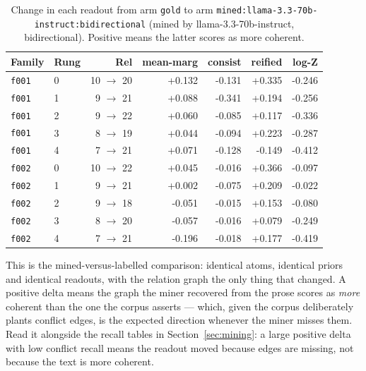 \documentclass[11pt]{article}
\begin{document}
\begin{table}[htbp]
\centering
\small
\caption{Change in each readout from arm \texttt{gold} to arm \texttt{mined:llama-3.3-70b-instruct:bidirectional} (mined by llama-3.3-70b-instruct, bidirectional). Positive means the latter scores as more coherent.}
\label{tab:arm-delta-gold-mined-llama-3-3-70b-instruct-bidirectional}
\begin{tabular}{llrrrrr}
\toprule
Family & Rung & Rel & \textbf{mean-marg} & \textbf{consist} & \textbf{reified} & \textbf{log-Z} \\
\midrule
\texttt{f001} & 0 & 10 $\to$ 20 & +0.132 & -0.131 & +0.335 & -0.246 \\
\texttt{f001} & 1 & 9 $\to$ 21 & +0.088 & -0.341 & +0.194 & -0.256 \\
\texttt{f001} & 2 & 9 $\to$ 22 & +0.060 & -0.085 & +0.117 & -0.336 \\
\texttt{f001} & 3 & 8 $\to$ 19 & +0.044 & -0.094 & +0.223 & -0.287 \\
\texttt{f001} & 4 & 7 $\to$ 21 & +0.071 & -0.128 & -0.149 & -0.412 \\
\texttt{f002} & 0 & 10 $\to$ 22 & +0.045 & -0.016 & +0.366 & -0.097 \\
\texttt{f002} & 1 & 9 $\to$ 21 & +0.002 & -0.075 & +0.209 & -0.022 \\
\texttt{f002} & 2 & 9 $\to$ 18 & -0.051 & -0.015 & +0.153 & -0.080 \\
\texttt{f002} & 3 & 8 $\to$ 20 & -0.057 & -0.016 & +0.079 & -0.249 \\
\texttt{f002} & 4 & 7 $\to$ 21 & -0.196 & -0.018 & +0.177 & -0.419 \\
\bottomrule
\end{tabular}
\end{table}

This is the mined-versus-labelled comparison: identical atoms, identical priors and identical readouts, with the relation graph the only thing that changed. A positive delta means the graph the miner recovered from the prose scores as \emph{more} coherent than the one the corpus asserts --- which, given the corpus deliberately plants conflict edges, is the expected direction whenever the miner misses them. Read it alongside the recall tables in Section~\ref{sec:mining}: a large positive delta with low conflict recall means the readout moved because edges are missing, not because the text is more coherent.
\end{document}
